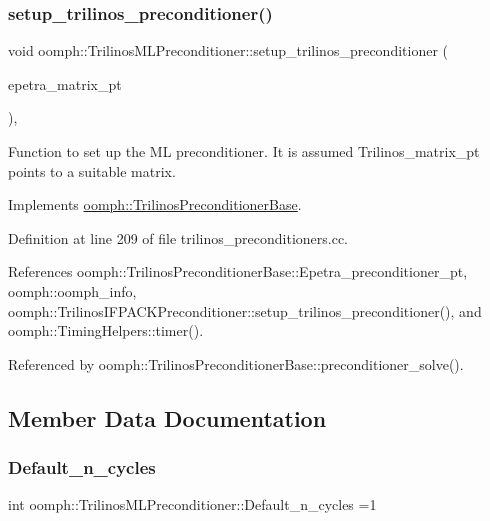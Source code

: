 \subsubsection{\texorpdfstring{setup\+\_\+trilinos\+\_\+preconditioner()}{setup\_trilinos\_preconditioner()}}
{\footnotesize\ttfamily void oomph\+::\+Trilinos\+M\+L\+Preconditioner\+::setup\+\_\+trilinos\+\_\+preconditioner (\begin{DoxyParamCaption}\item[{Epetra\+\_\+\+Crs\+Matrix $\ast$}]{epetra\+\_\+matrix\+\_\+pt }\end{DoxyParamCaption})\hspace{0.3cm}{\ttfamily [protected]}, {\ttfamily [virtual]}}



Function to set up the ML preconditioner. It is assumed Trilinos\+\_\+matrix\+\_\+pt points to a suitable matrix. 



Implements \hyperlink{classoomph_1_1TrilinosPreconditionerBase_aeb2b1cee61617fd68a8beb911ddc4a62}{oomph\+::\+Trilinos\+Preconditioner\+Base}.



Definition at line 209 of file trilinos\+\_\+preconditioners.\+cc.



References oomph\+::\+Trilinos\+Preconditioner\+Base\+::\+Epetra\+\_\+preconditioner\+\_\+pt, oomph\+::oomph\+\_\+info, oomph\+::\+Trilinos\+I\+F\+P\+A\+C\+K\+Preconditioner\+::setup\+\_\+trilinos\+\_\+preconditioner(), and oomph\+::\+Timing\+Helpers\+::timer().



Referenced by oomph\+::\+Trilinos\+Preconditioner\+Base\+::preconditioner\+\_\+solve().



\subsection{Member Data Documentation}
\mbox{\label{classoomph_1_1TrilinosMLPreconditioner_a638b49c98a6afa2a4133038b42d6dea7}} 
\subsubsection{\texorpdfstring{Default\+\_\+n\+\_\+cycles}{Default\_n\_cycles}}
{\footnotesize\ttfamily int oomph\+::\+Trilinos\+M\+L\+Preconditioner\+::\+Default\+\_\+n\+\_\+cycles =1\hspace{0.3cm}{\ttfamily [static]}}



